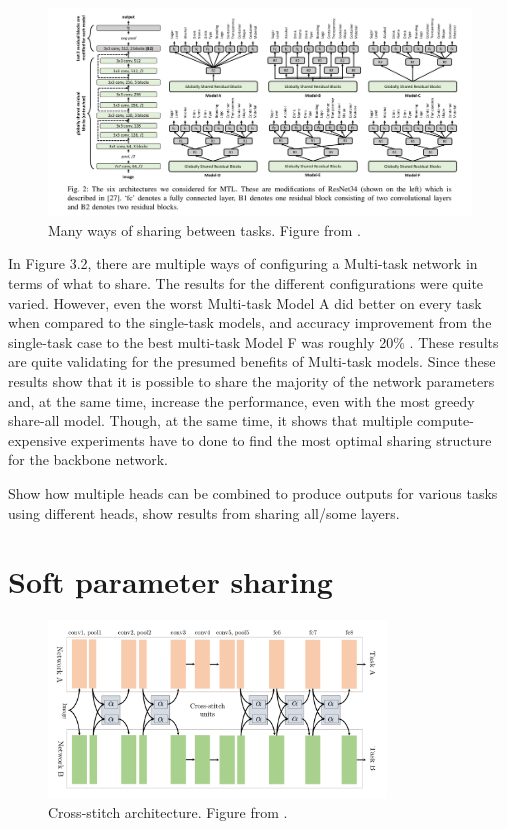\begin{figure}[h!]
    \centering
    \includegraphics[width=1\textwidth]{imgs/multipleShares.png}
    \caption{Many ways of sharing between tasks. Figure from \citep{healthyDrink}.\label{fig:params}}
\end{figure}

In Figure 3.2, there are multiple ways of configuring a Multi-task network in terms of what to share.
The results for the different configurations were quite varied.
However, even the worst Multi-task Model A did better on every task when compared to the single-task models, and accuracy improvement from the single-task case to the best multi-task Model F was roughly 20\% \citep{healthyDrink}.
These results are quite validating for the presumed benefits of Multi-task models.
Since these results show that it is possible to share the majority of the network parameters and, at the same time, increase the performance, even with the most greedy share-all model.
Though, at the same time, it shows that multiple compute-expensive experiments have to done to find the most optimal sharing structure for the backbone network.

Show how multiple heads can be combined to produce outputs for various tasks using different heads, show results from sharing all/some layers. \citep{visualPerson} \citep{selfDriving} \citep{healthyDrink}

\section{Soft parameter sharing}

\begin{figure}[h!]
    \centering
    \includegraphics[width=0.8\textwidth]{imgs/stitch.png}
    \caption{Cross-stitch architecture. Figure from \citep{crossStitch}.\label{fig:params}}
\end{figure}

